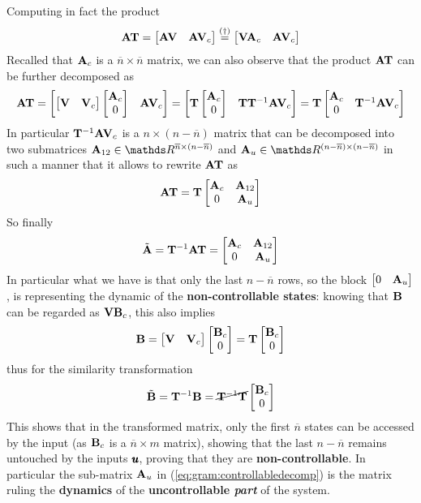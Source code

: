 	Computing in fact the product
	\[\mathbf{A}\mathbf{T}= \begin{bmatrix} \mathbf{A} \mathbf{V} & \mathbf{A} \mathbf{V}_c \end{bmatrix} \stackrel{(\dagger)}{=} \begin{bmatrix}  \mathbf{V} \mathbf{A}_c & \mathbf{A} \mathbf{V}_c  \end{bmatrix}\]
	Recalled that $\mathbf{A}_c$ is a $\overline n\times \overline n$ matrix, we can also observe that the product $\mathbf{A}\mathbf{T}$ can be further decomposed as
	\[ \A \T = \matrix{ \matrix{\V & \V_c} \matrix{\A_c \\ 0} & \A \V_c } = \matrix{\T \matrix{\A_c \\ 0} & \T\T^{-1}\A\V_c } = \T \matrix{\A_c & \multirow{2}{*}{$\T^{-1} \A \V_c$} \\ 0  } \]
	In particular $\mathbf{T}^{-1} \mathbf{A}\mathbf{V}_c$ is a $n\times (n-\overline n)$ matrix that can be decomposed into two submatrices $\A_{12} \in \mathds R^{\overline n\times(n-\overline n)}$ and $\A_u \in \mathds R^{(n-\overline n)\times(n-\overline n)}$ in such a manner that it allows to rewrite $\mathbf{A} \mathbf{T}$ as
	\[ \mathbf{A}\mathbf{T} = \mathbf{T} \begin{bmatrix} \mathbf{A}_c & \mathbf{A}_{12} \\ 0 & \mathbf{A}_u \end{bmatrix} \]
	So finally
	\begin{equation} \label{eq:gram:controllabledecomp}
		\tilde {\mathbf{A}} = \mathbf{T}^{-1}\mathbf{A}\mathbf{T} = \begin{bmatrix} \mathbf{A}_c & \mathbf{A}_{12} \\ 0 & \mathbf{A}_u \end{bmatrix}
	\end{equation}
	In particular what we have is that only the last $n-\overline n$ rows, so the block $\begin{bmatrix} 0&\mathbf{A}_u \end{bmatrix}$, is representing the dynamic of the \textbf{non-controllable states}: knowing that $\mathbf{B}$ can be regarded as $\mathbf{V} \mathbf{B}_c$, this also implies 
	\[ \mathbf{B} = \begin{bmatrix} \mathbf{V}&\mathbf{V}_c \end{bmatrix}\begin{bmatrix} \mathbf{B}_c\\0 \end{bmatrix} = \mathbf{T} \begin{bmatrix} \mathbf{B}_c \\ 0 \end{bmatrix} \]
	thus for the similarity transformation
	\[ \tilde {\mathbf{B}}= \mathbf{T}^{-1}\mathbf{B} = \cancel{\mathbf{T}^{-1}\mathbf{T}} \begin{bmatrix} \mathbf{B}_c\\0 \end{bmatrix} \]
	This shows that in the transformed matrix, only the first $\overline n$ states can be accessed by the input (as $\mathbf{B}_c$ is a $\overline n \times m$ matrix), showing that the last $n-\overline n$ remains untouched by the inputs $\pmb{u}$, proving that they are \textbf{non-controllable}. In particular the sub-matrix $\mathbf{A}_u$ in (\ref{eq:gram:controllabledecomp}) is the matrix ruling the \textbf{dynamics} of the \textbf{uncontrollable \textit{part}} of the system.
	
